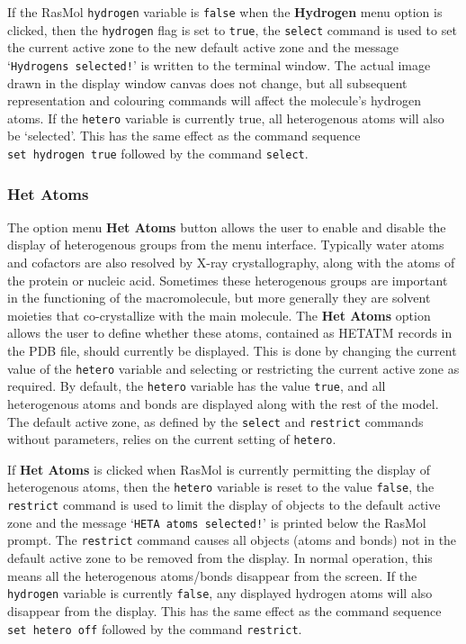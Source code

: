 If the RasMol {\tt hydrogen} variable is {\tt false} when the {\bf Hydrogen}
menu option is clicked, then the {\tt hydrogen} flag is set to {\tt true}, 
the {\tt select} command is used to set the current active zone to the new
default active zone and the message `{\tt Hydrogens selected!}' is written
to the terminal window. The actual image drawn in the display window canvas
does not change, but all subsequent representation and colouring commands
will affect the molecule's hydrogen atoms. If the {\tt hetero} variable is 
currently true, all heterogenous atoms will also be `selected'. This has 
the same effect as the command sequence {\tt set~hydrogen~true} followed by 
the command {\tt select}.

\subsubsection{Het Atoms}
\label{OHetero}
The option menu {\bf Het Atoms} button allows the user to enable and disable
the display of heterogenous groups from the menu interface. Typically 
water atoms and cofactors are also resolved by X-ray crystallography, along
with the atoms of the protein or nucleic acid. Sometimes these heterogenous
groups are important in the functioning of the macromolecule, but more 
generally they are solvent moieties that co-crystallize with the main
molecule. The {\bf Het Atoms} option allows the user to define whether
these atoms, contained as HETATM records in the PDB file, should currently be
displayed. This is done by changing the current value of the {\tt hetero}
variable and selecting or restricting the current active zone as required.
By default, the {\tt hetero} variable has the value {\tt true}, and all
heterogenous atoms and bonds are displayed along with the rest of the model.
The default active zone, as defined by the {\tt select} and {\tt restrict}
commands without parameters, relies on the current setting of {\tt hetero}.

If {\bf Het Atoms} is clicked when RasMol is currently permitting the
display of heterogenous atoms, then the {\tt hetero} variable is reset to the
value {\tt false}, the {\tt restrict} command is used to limit the display
of objects to the default active zone and the message `{\tt HETA atoms
selected!}' is printed below the RasMol prompt. The {\tt restrict} command
causes all objects (atoms and bonds) not in the default active zone to be
removed from the display.  In normal operation, this means all the
heterogenous atoms/bonds disappear from the screen. If the {\tt hydrogen} 
variable is currently {\tt false}, any displayed hydrogen atoms will also 
disappear from the display. This has the same effect as the command 
sequence {\tt set~hetero~off} followed by the command {\tt restrict}.


